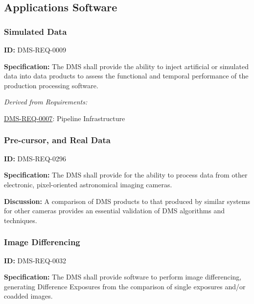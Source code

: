 \documentclass[SE,toc,lsstdraft]{lsstdoc}
\begin{document}
\subsection{Applications Software}





\subsubsection{Simulated Data}

\label{DMS-REQ-0009}
\textbf{ID:} DMS-REQ-0009

\textbf{Specification:} The DMS shall provide the ability to inject artificial or simulated data into data products to assess the functional and temporal performance of the production processing software.






\emph{Derived from Requirements:}

\hyperref[DMS-REQ-0007]{DMS-REQ-0007}:
Pipeline Infrastructure \newline


\subsubsection{Pre-cursor, and Real Data}

\label{DMS-REQ-0296}
\textbf{ID:} DMS-REQ-0296

\textbf{Specification:} The DMS shall provide for the ability to process data from other electronic, pixel-oriented astronomical imaging cameras.

\textbf{Discussion: }A comparison of DMS products to that produced by similar systems for other cameras provides an essential validation of DMS algorithms and techniques.




\subsubsection{Image Differencing}

\label{DMS-REQ-0032}
\textbf{ID:} DMS-REQ-0032

\textbf{Specification:} The DMS shall provide software to perform image differencing, generating Difference Exposures from the comparison of single exposures and/or coadded images.
\end{document}
